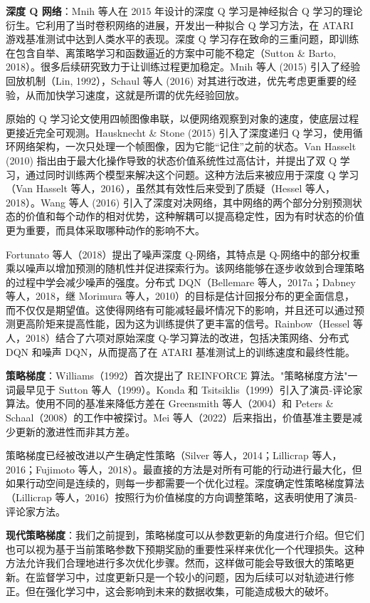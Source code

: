 \documentclass[lang=cn,newtx,10pt,scheme=chinese]{elegantbook}
\begin{document}
\textbf{深度 Q 网络}：Mnih 等人在 2015 年设计的深度 Q 学习是神经拟合 Q 学习的理论衍生。它利用了当时卷积网络的进展，开发出一种拟合 Q 学习方法，在 ATARI 游戏基准测试中达到人类水平的表现。深度 Q 学习存在致命的三重问题，即训练在包含自举、离策略学习和函数逼近的方案中可能不稳定（Sutton \& Barto, 2018）。很多后续研究致力于让训练过程更加稳定。Mnih 等人 (2015) 引入了经验回放机制（Lin, 1992），Schaul 等人 (2016) 对其进行改进，优先考虑更重要的经验，从而加快学习速度，这就是所谓的优先经验回放。

原始的 Q 学习论文使用四帧图像串联，以便网络观察到对象的速度，使底层过程更接近完全可观测。Hausknecht \& Stone (2015) 引入了深度递归 Q 学习，使用循环网络架构，一次只处理一个帧图像，因为它能“记住”之前的状态。Van Hasselt (2010) 指出由于最大化操作导致的状态价值系统性过高估计，并提出了双 Q 学习，通过同时训练两个模型来解决这个问题。这种方法后来被应用于深度 Q 学习（Van Hasselt 等人，2016），虽然其有效性后来受到了质疑（Hessel 等人，2018）。Wang 等人 (2016) 引入了深度对决网络，其中网络的两个部分分别预测状态的价值和每个动作的相对优势，这种解耦可以提高稳定性，因为有时状态的价值更为重要，而具体采取哪种动作的影响不大。

Fortunato 等人（2018）提出了噪声深度 Q-网络，其特点是 Q-网络中的部分权重乘以噪声以增加预测的随机性并促进探索行为。该网络能够在逐步收敛到合理策略的过程中学会减少噪声的强度。分布式 DQN（Bellemare 等人，2017a；Dabney 等人，2018，继 Morimura 等人，2010）的目标是估计回报分布的更全面信息，而不仅仅是期望值。这使得网络有可能减轻最坏情况下的影响，并且还可以通过预测更高阶矩来提高性能，因为这为训练提供了更丰富的信号。Rainbow（Hessel 等人，2018）结合了六项对原始深度 Q-学习算法的改进，包括决策网络、分布式 DQN 和噪声 DQN，从而提高了在 ATARI 基准测试上的训练速度和最终性能。

\textbf{策略梯度}：Williams（1992）首次提出了 REINFORCE 算法。"策略梯度方法"一词最早见于 Sutton 等人（1999）。Konda 和 Tsitsiklis（1999）引入了演员-评论家算法。使用不同的基准来降低方差在 Greensmith 等人（2004）和 Peters \& Schaal（2008）的工作中被探讨。Mei 等人（2022）后来指出，价值基准主要是减少更新的激进性而非其方差。

策略梯度已经被改进以产生确定性策略（Silver 等人，2014；Lillicrap 等人，2016；Fujimoto 等人，2018）。最直接的方法是对所有可能的行动进行最大化，但如果行动空间是连续的，则每一步都需要一个优化过程。深度确定性策略梯度算法（Lillicrap 等人，2016）按照行为价值梯度的方向调整策略，这表明使用了演员-评论家方法。

\textbf{现代策略梯度}：我们之前提到，策略梯度可以从参数更新的角度进行介绍。但它们也可以视为基于当前策略参数下预期奖励的重要性采样来优化一个代理损失。这种方法允许我们合理地进行多次优化步骤。然而，这样做可能会导致很大的策略更新。在监督学习中，过度更新只是一个较小的问题，因为后续可以对轨迹进行修正。但在强化学习中，这会影响到未来的数据收集，可能造成极大的破坏。
\end{document}
